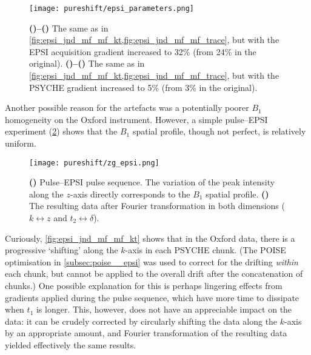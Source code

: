 \begin{figure}[htb]
    \centering
    \texttt{[image: pureshift/epsi\_parameters.png]}%
    {\label{fig:epsi_parameters_moreepsi_kt}}%
    {\label{fig:epsi_parameters_moreepsi_trace}}%
    {\label{fig:epsi_parameters_morepsyche_kt}}%
    {\label{fig:epsi_parameters_morepsyche_trace}}%
    \caption[Effects of varying acquisition parameters on ultrafast PSYCHE-iDOSY spectra]{
        \textbf{()--()} The same as in \cref{fig:epsi_jnd_mf_mf_kt,fig:epsi_jnd_mf_mf_trace}, but with the EPSI acquisition gradient increased to 32\% (from 24\% in the original).
        \textbf{()--()} The same as in \cref{fig:epsi_jnd_mf_mf_kt,fig:epsi_jnd_mf_mf_trace}, but with the PSYCHE gradient increased to 5\% (from 3\% in the original).        
    }
    \label{fig:epsi_parameters}
\end{figure}

Another possible reason for the artefacts was a potentially poorer $B_1$ homogeneity on the Oxford instrument.
However, a simple pulse--EPSI experiment (\cref{fig:zg_epsi}) shows that the $B_1$ spatial profile, though not perfect, is relatively uniform.

\begin{figure}[htb]
    \centering
    \texttt{[image: pureshift/zg\_epsi.png]}%
    {\label{fig:zg_epsi_pulseq}}%
    {\label{fig:zg_epsi_spec}}%
    \caption[Pulse--EPSI pulse sequence and data]{
        \textbf{()} Pulse--EPSI pulse sequence. The variation of the peak intensity along the $z$-axis directly corresponds to the $B_1$ spatial profile.
        \textbf{()} The resulting data after Fourier transformation in both dimensions ($k \leftrightarrow z$ and $t_2 \leftrightarrow \delta$).
    }
    \label{fig:zg_epsi}
\end{figure}

Curiously, \cref{fig:epsi_jnd_mf_mf_kt} shows that in the Oxford data, there is a progressive `shifting' along the $k$-axis in each PSYCHE chunk.
(The POISE optimisation in \cref{subsec:poise__epsi} was used to correct for the drifting \textit{within} each chunk, but cannot be applied to the overall drift after the concatenation of chunks.)
One possible explanation for this is perhaps lingering effects from gradients applied during the pulse sequence, which have more time to dissipate when $t_1$ is longer.
This, however, does not have an appreciable impact on the data: it can be crudely corrected by circularly shifting the data along the $k$-axis by an appropriate amount, and Fourier transformation of the resulting data yielded effectively the same results.

